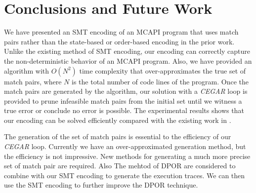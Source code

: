 \section{Conclusions and Future Work}
We have presented an SMT encoding of an MCAPI program that uses match pairs rather than the state-based or order-based encoding in the prior work. Unlike the existing method of SMT encoding, our encoding can correctly capture the non-deterministic behavior of an MCAPI program. Also, we have provided an algorithm with $O(N^2)$ time complexity that over-approximates the true set of match pairs, where $N$ is the total number of code lines of the program. Once the match pairs are generated by the algorithm, our solution with a \textit{CEGAR} loop is provided to prune infeasible match pairs from the initial set until we witness a true error or conclude no error is possible. The experimental results shows that our encoding can be solved efficiently compared with the existing work in \cite{elwakil:padtad10}.

The generation of the set of match pairs is essential to the efficiency of our \textit{CEGAR} loop. Currently we have an over-approximated generation method, but the efficiency is not impressive. New methods for generating a much more precise set of match pair are required. Also The mehtod of DPOR are considered to combine with our SMT encoding to generate the execution traces. We can then use the SMT encoding to further improve the DPOR technique.

